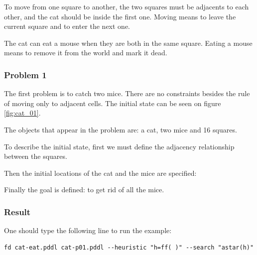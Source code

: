 To move from one square to another, the two squares must be adjacents to each other, and the cat should be inside the first one. Moving means to leave the current square and to enter the next one.



The cat can eat a mouse when they are both in the same square. Eating a mouse means to remove it from the world and mark it dead.




\subsubsection{Problem 1}

The first problem is to catch two mice. There are no constraints besides the rule of moving only to adjacent cells. The initial state can be seen on figure \ref{fig:cat_01}.

The objects that appear in the problem are: a cat, two mice and 16 squares.



To describe the initial state, first we must define the adjacency relationship between the squares.



Then the initial locations of the cat and the mice are specified:



Finally the goal is defined: to get rid of all the mice.




\subsubsection{Result}

One should type the following line to run the example: 

\begin{lstlisting}[numbers=none]
fd cat-eat.pddl cat-p01.pddl --heuristic "h=ff( )" --search "astar(h)"
\end{lstlisting}

